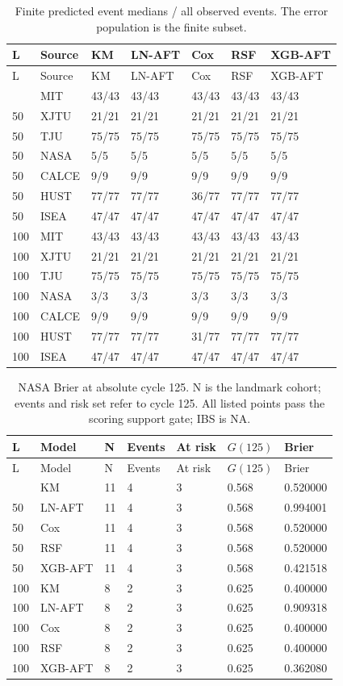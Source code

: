 \documentclass[10pt,a4paper]{article}
\begin{document}
{\scriptsize
\begin{longtable}{@{\extracolsep{\fill}}lllllll}
\caption{Finite predicted event medians / all observed events. The error population is the finite subset.}\label{tab:median_availability}\\
\toprule
L & Source & KM & LN-AFT & Cox & RSF & XGB-AFT\\\midrule
\endfirsthead
\toprule
L & Source & KM & LN-AFT & Cox & RSF & XGB-AFT\\\midrule
\endhead
\bottomrule\endfoot
50 & MIT & 43/43 & 43/43 & 43/43 & 43/43 & 43/43\\
50 & XJTU & 21/21 & 21/21 & 21/21 & 21/21 & 21/21\\
50 & TJU & 75/75 & 75/75 & 75/75 & 75/75 & 75/75\\
50 & NASA & 5/5 & 5/5 & 5/5 & 5/5 & 5/5\\
50 & CALCE & 9/9 & 9/9 & 9/9 & 9/9 & 9/9\\
50 & HUST & 77/77 & 77/77 & 36/77 & 77/77 & 77/77\\
50 & ISEA & 47/47 & 47/47 & 47/47 & 47/47 & 47/47\\
100 & MIT & 43/43 & 43/43 & 43/43 & 43/43 & 43/43\\
100 & XJTU & 21/21 & 21/21 & 21/21 & 21/21 & 21/21\\
100 & TJU & 75/75 & 75/75 & 75/75 & 75/75 & 75/75\\
100 & NASA & 3/3 & 3/3 & 3/3 & 3/3 & 3/3\\
100 & CALCE & 9/9 & 9/9 & 9/9 & 9/9 & 9/9\\
100 & HUST & 77/77 & 77/77 & 31/77 & 77/77 & 77/77\\
100 & ISEA & 47/47 & 47/47 & 47/47 & 47/47 & 47/47\\
\end{longtable}}
{\scriptsize
\begin{longtable}{@{\extracolsep{\fill}}lllllll}
\caption{NASA Brier at absolute cycle 125. N is the landmark cohort; events and risk set refer to cycle 125. All listed points pass the scoring support gate; IBS is NA.}\label{tab:nasa125}\\
\toprule
L & Model & N & Events & At risk & $G(125)$ & Brier\\\midrule
\endfirsthead
\toprule
L & Model & N & Events & At risk & $G(125)$ & Brier\\\midrule
\endhead
\bottomrule\endfoot
50 & KM & 11 & 4 & 3 & 0.568 & 0.520000\\
50 & LN-AFT & 11 & 4 & 3 & 0.568 & 0.994001\\
50 & Cox & 11 & 4 & 3 & 0.568 & 0.520000\\
50 & RSF & 11 & 4 & 3 & 0.568 & 0.520000\\
50 & XGB-AFT & 11 & 4 & 3 & 0.568 & 0.421518\\
100 & KM & 8 & 2 & 3 & 0.625 & 0.400000\\
100 & LN-AFT & 8 & 2 & 3 & 0.625 & 0.909318\\
100 & Cox & 8 & 2 & 3 & 0.625 & 0.400000\\
100 & RSF & 8 & 2 & 3 & 0.625 & 0.400000\\
100 & XGB-AFT & 8 & 2 & 3 & 0.625 & 0.362080\\
\end{longtable}}
\end{document}
